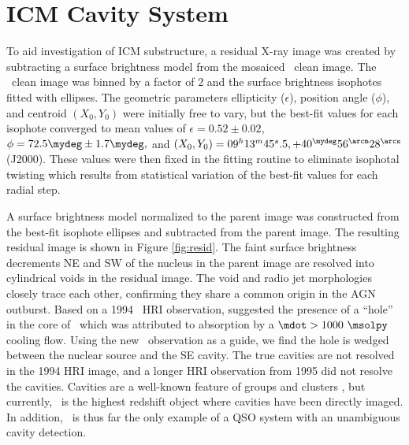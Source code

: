 \documentclass[useAMS,usenatbib]{mn2e}
\begin{document}

\section{ICM Cavity System}
\label{sec:cavs}

To aid investigation of ICM substructure, a residual X-ray image was
created by subtracting a surface brightness model from the mosaiced
\chandra\ clean image. The \chandra\ clean image was binned by a
factor of 2 and the surface brightness isophotes fitted with
ellipses. The geometric parameters ellipticity ($\epsilon$), position
angle ($\phi$), and centroid $(X_0,Y_0)$ were initially free to vary,
but the best-fit values for each isophote converged to mean values of
$\epsilon = 0.52 \pm 0.02$, $\phi = 72.5\mydeg \pm 1.7\mydeg,$ and
$(X_0,Y_0) = \ellradec$ (J2000). These values were then fixed in the
fitting routine to eliminate isophotal twisting which results from
statistical variation of the best-fit values for each radial step.

A surface brightness model normalized to the parent image was
constructed from the best-fit isophote ellipses and subtracted from
the parent image. The resulting residual image is shown in Figure
\ref{fig:resid}. The faint surface brightness decrements NE and SW of
the nucleus in the parent image are resolved into cylindrical voids in
the residual image. The void and radio jet morphologies closely trace
each other, confirming they share a common origin in the AGN
outburst. Based on a 1994 \rosat\ HRI observation,
\citet{1995MNRAS.274L..63F} suggested the presence of a ``hole'' in
the core of \rxj\ which was attributed to absorption by a $\mdot >
1000 ~\msolpy$ cooling flow. Using the new \chandra\ observation as a
guide, we find the hole is wedged between the nuclear source and the
SE cavity. The true cavities are not resolved in the 1994 HRI image,
and a longer HRI observation from 1995 did not resolve the
cavities. Cavities are a well-known feature of groups and clusters
\citep[\eg][]{birzan04, 2005MNRAS.364.1343D}, but currently, \irs\ is
the highest redshift object where cavities have been directly
imaged. In addition, \irs\ is thus far the only example of a QSO
system with an unambiguous cavity detection.
\end{document}
